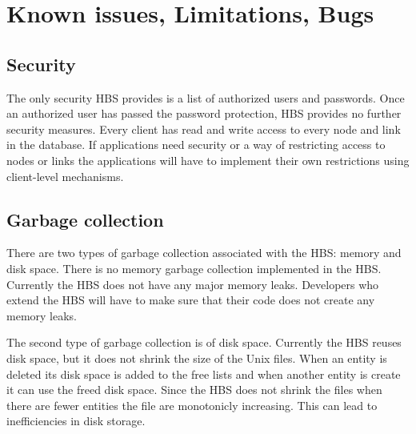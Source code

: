 
\section{Known issues, Limitations, Bugs}
\label{sec:limitations}

\subsection{Security}

The only security HBS provides is a list of authorized users and passwords.
Once an authorized user has passed the password protection, HBS provides no
further security measures.  Every client has read and write access to every
node and link in the database.  If applications need security or a way of
restricting access to nodes or links the applications will have to
implement their own restrictions using client-level mechanisms.

\subsection{Garbage collection}

There are two types of garbage collection associated with the HBS: memory
and disk space.  There is no memory garbage collection implemented in the
HBS.  Currently the HBS does not have any major memory leaks.  Developers
who extend the HBS will have to make sure that their code does not create
any memory leaks.

The second type of garbage collection is of disk space.
Currently the HBS reuses disk space, but it does not shrink the size of the
Unix files.  When an entity is deleted its disk space is added to the free
lists and when another entity is create it can use the freed disk space.
Since the HBS does not shrink the files when there are fewer entities the
file are monotonicly increasing.  This can lead to inefficiencies in disk
storage. 

